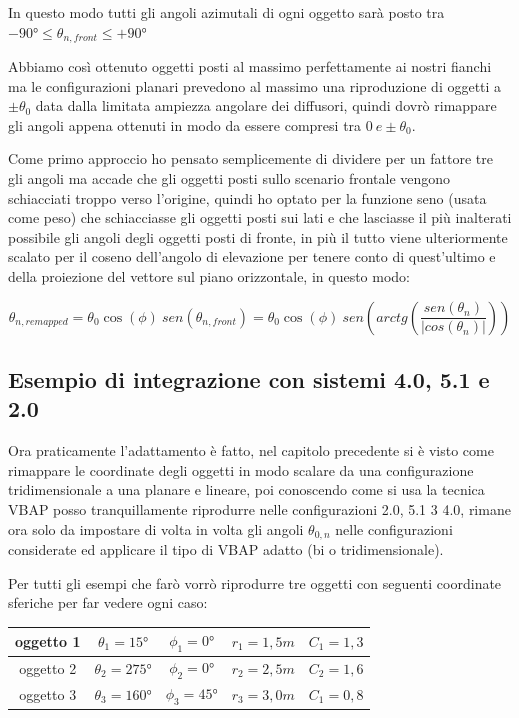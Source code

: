 \documentclass[12pt,a4paper]{report}
\begin{document}
In questo modo tutti gli angoli azimutali di ogni oggetto sarà posto tra $-90° \leq \theta_{n,front} \leq +90°$

Abbiamo così ottenuto oggetti posti al massimo perfettamente ai nostri fianchi ma le configurazioni planari prevedono al massimo una riproduzione di oggetti a $\pm \theta_0$ data dalla limitata ampiezza angolare dei diffusori, quindi dovrò rimappare gli angoli appena ottenuti in modo da essere compresi tra $0\ e \pm \theta_0$.

Come primo approccio ho pensato semplicemente di dividere per un fattore tre gli angoli ma accade che gli oggetti posti sullo scenario frontale vengono schiacciati troppo verso l'origine, quindi ho optato per la funzione seno (usata come peso) che schiacciasse gli oggetti posti sui lati e che lasciasse il più inalterati possibile gli angoli degli oggetti posti di fronte, in più il tutto viene ulteriormente scalato per il coseno dell'angolo di elevazione per tenere conto di quest'ultimo e della proiezione del vettore sul piano orizzontale, in questo modo:

\begin{equation}
\theta_{n, remapped}= \theta_0 \cos(\phi) \ sen (\theta_{n,front}) = \theta_0 \cos(\phi)\ sen \left( arctg  \left( \dfrac{sen(\theta_n)}{\vert cos(\theta_n)\vert } \right)\right)
\label{mmmm}
\end{equation}





\subsection{Esempio di integrazione con sistemi 4.0, 5.1 e 2.0}

Ora praticamente l'adattamento è fatto, nel capitolo precedente si è visto come rimappare le coordinate degli oggetti in modo scalare da una configurazione tridimensionale a una planare e lineare, poi conoscendo come si usa la tecnica VBAP posso tranquillamente riprodurre nelle configurazioni 2.0, 5.1 3 4.0, rimane ora solo da impostare di volta in volta gli angoli $\theta_{0,n}$ nelle configurazioni considerate ed applicare il tipo di VBAP adatto (bi o tridimensionale).

Per tutti gli esempi che farò vorrò riprodurre tre oggetti con seguenti coordinate sferiche per far vedere ogni caso:\\

\begin{tabular}{|c|c|c|c|c|}
\hline
oggetto 1 & $\theta_1=15°$ & $\phi_1=0°$ & $r_1=1,5m$ & $C_1=1,3$ \\
\hline
oggetto 2 & $\theta_2=275°$ & $\phi_2=0°$ & $r_2=2,5m$ & $C_2=1,6$ \\
\hline
oggetto 3 & $\theta_3=160°$ & $\phi_3=45°$ & $r_3=3,0m$ & $C_1=0,8$ \\
\hline

\end{tabular} \\ \\
\end{document}
